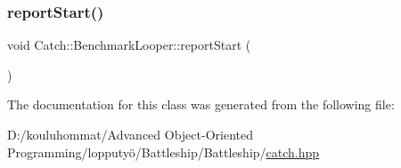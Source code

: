 \mbox{\label{class_catch_1_1_benchmark_looper_a0697d1b266112b110edf2025b82c4e77}} 
\subsubsection{\texorpdfstring{report\+Start()}{reportStart()}}
{\footnotesize\ttfamily void Catch\+::\+Benchmark\+Looper\+::report\+Start (\begin{DoxyParamCaption}{ }\end{DoxyParamCaption})}



The documentation for this class was generated from the following file\+:\begin{DoxyCompactItemize}
\item 
D\+:/kouluhommat/\+Advanced Object-\/\+Oriented Programming/lopputyö/\+Battleship/\+Battleship/\mbox{\hyperlink{catch_8hpp}{catch.\+hpp}}\end{DoxyCompactItemize}
